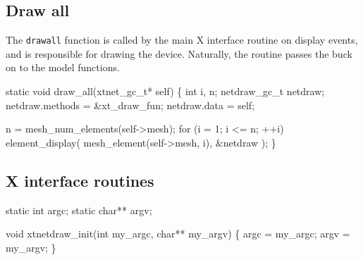 \nwendcode{}\nwdocspar


\subsection{Draw all}

The {\tt{}draw{}all} function is called by the main X interface routine
on display events, and is responsible for drawing the device.
Naturally, the routine passes the buck on to the model functions.

\nwenddocs{}\endmoddef
static void draw_all(xtnet_gc_t* self)
\{
    int i, n;
    netdraw_gc_t netdraw;
    netdraw.methods = &xt_draw_fun;
    netdraw.data    = self;

    n = mesh_num_elements(self->mesh);
    for (i = 1; i <= n; ++i)
        element_display( mesh_element(self->mesh, i), &netdraw );
\}

\nwendcode{}\nwdocspar


\subsection{X interface routines}

\nwenddocs{}\plusendmoddef
static int    argc;
static char** argv;

\nwendcode{}\nwdocspar

\nwenddocs{}\endmoddef
void xtnetdraw_init(int my_argc, char** my_argv)
\{
    argc = my_argc;
    argv = my_argv;
\}

\nwendcode{}\nwdocspar

